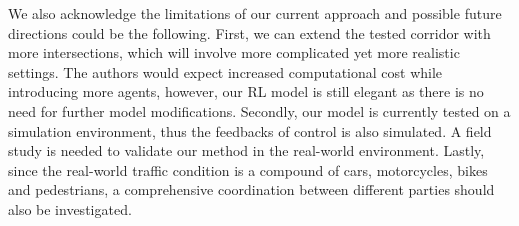  We also acknowledge the limitations of our current approach and possible future directions could be the following. First, we can extend the tested corridor with more intersections, which will involve more complicated yet more realistic settings. The authors would expect increased computational cost while introducing more agents, however, our RL model is still elegant as there is no need for further model modifications. Secondly, our model is currently tested on a simulation environment, thus the feedbacks of control is also simulated. A field study is needed to validate our method in the real-world environment. Lastly, since the real-world traffic condition is a compound of cars, motorcycles, bikes and pedestrians, a comprehensive coordination between different parties should also be investigated. 